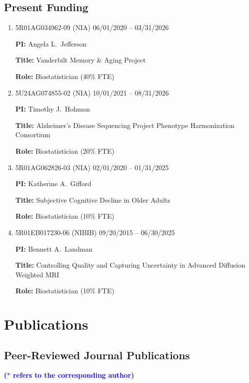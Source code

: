 \documentclass[12pt]{article}
\begin{document}
	\subsection*{Present Funding}
	\begin{enumerate}
		\item 5R01AG034962-09 (NIA) \hfill 06/01/2020 -- 03/31/2026
		
		{\bf PI:} Angela L.\ Jefferson
		
		{\bf Title:} Vanderbilt Memory \& Aging Project
		
		{\bf Role:} Biostatistician (40\% FTE)
		\item 5U24AG074855-02 (NIA) \hfill 10/01/2021 -- 08/31/2026
		
		{\bf PI:} Timothy J.\ Hohman
		
		{\bf Title:} Alzheimer's Disease Sequencing Project Phenotype Harmonization Consortium
		
		{\bf Role:} Biostatistician (20\% FTE)
		\item 5R01AG062826-03 (NIA) \hfill 02/01/2020 -- 01/31/2025
		
		{\bf PI:} Katherine A.\ Gifford
		
		{\bf Title:} Subjective Cognitive Decline in Older Adults
		
		{\bf Role:} Biostatistician (10\% FTE)
		
		\item 5R01EB017230-06 (NIBIB) \hfill 09/20/2015 -- 06/30/2025
		
		{\bf PI:} Bennett A.\ Landman
		
		{\bf Title:} Controlling Quality and Capturing Uncertainty 
		in Advanced Diffusion Weighted MRI
		
		{\bf Role:} Biostatistician (10\% FTE)
	\end{enumerate}
	
	\section*{Publications}
	\subsection*{Peer-Reviewed Journal Publications}
	
	{\bf \textcolor{blue}{($\ast$ refers to the corresponding author)}}
	
	\noindent {\bf \textcolor{brown}{($\dagger$ refers to my students, postdocs 
			or trainees)}}
	
\end{document}
